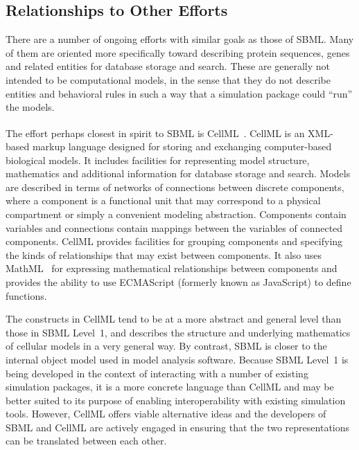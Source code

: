 \documentclass[10pt]{cekarticle}
\newcommand{\tm}{\textsuperscript{\tiny{\texttrademark}}}
\begin{document}
\subsection{Relationships to Other Efforts}
\label{sec:other-efforts}


There are a number of ongoing efforts with similar goals as those of SBML.
Many of them are oriented more specifically toward describing protein
sequences, genes and related entities for database storage and search.
These are generally not intended to be computational models, in the sense
that they do not describe entities and behavioral rules in such a way that
a simulation package could ``run'' the models.

The effort perhaps closest in spirit to SBML is
CellML\tm~\citep{physiome:2001}.  CellML is an XML-based markup language
designed for storing and exchanging computer-based biological models.  It
includes facilities for representing model structure, mathematics and
additional information for database storage and search.  Models are
described in terms of networks of connections between discrete components,
where a component is a functional unit that may correspond to a physical
compartment or simply a convenient modeling abstraction.  Components
contain variables and connections contain mappings between the variables of
connected components.  CellML provides facilities for grouping components
and specifying the kinds of relationships that may exist between
components.  It also uses MathML~\citep{w3c:2000b} for expressing mathematical
relationships between components and provides the ability to use ECMAScript
(formerly known as JavaScript) to define functions.

The constructs in CellML tend to be at a more abstract and general level
than those in SBML Level~1, and describes the structure and underlying
mathematics of cellular models in a very general way.  By contrast, SBML is
closer to the internal object model used in model analysis software.
Because SBML Level~1 is being developed in the context of interacting with
a number of existing simulation packages, it is a more concrete language
than CellML and may be better suited to its purpose of enabling
interoperability with existing simulation tools.  However, CellML offers
viable alternative ideas and the developers of SBML and CellML are actively
engaged in ensuring that the two representations can be translated between
each other.
\end{document}
